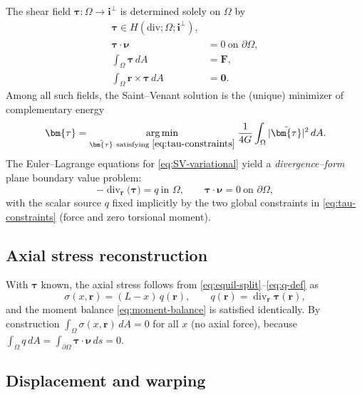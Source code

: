 The shear field $\bm{\tau}:\Omega\to\mathbf{i}^\perp$ is determined solely on $\Omega$ by
\begin{equation}
\begin{aligned}
\bm{\tau}\in H(\mathrm{div};\Omega;\mathbf{i}^\perp),\\ 
\bm{\tau}\cdot\bm{\nu}&=0\ \text{on }\partial\Omega,\\
\int_\Omega \bm{\tau}\,dA&=\bm{F},\\
\int_\Omega \bm{r}\times\bm{\tau}\,dA&=\mathbf{0}.
\end{aligned}
\label{eq:tau-constraints}
\end{equation}
Among all such fields, the Saint–Venant solution is the (unique) minimizer of complementary energy
\begin{equation}
\bm{\tau}=\underset{\tilde{\bm{\tau}}\ \text{satisfying }\eqref{eq:tau-constraints}}{\arg\min}\;
\frac{1}{4G}\int_\Omega |\tilde{\bm{\tau}}|^2\,dA.
\label{eq:SV-variational}
\end{equation}
The Euler–Lagrange equations for \eqref{eq:SV-variational} yield a \emph{divergence–form} plane boundary value problem:
\begin{equation}
-\operatorname{div}_{\bm{r}}\big(\bm{\tau}\big)=q\ \text{in }\Omega,\qquad 
\bm{\tau}\cdot\bm{\nu}=0\ \text{on }\partial\Omega,
\label{eq:tau-strong}
\end{equation}
with the scalar source $q$ fixed implicitly by the two global constraints in \eqref{eq:tau-constraints} (force and zero torsional moment). 

\subsection*{Axial stress reconstruction}

With $\bm{\tau}$ known, the axial stress follows from \eqref{eq:equil-split}–\eqref{eq:q-def} as
\begin{equation}
\sigma(x,\bm{r})=(L-x)\,q(\bm{r}),\qquad 
q(\bm{r})=\operatorname{div}_{\bm{r}}\bm{\tau}(\bm{r}),
\label{eq:sigma-from-tau}
\end{equation}
and the moment balance \eqref{eq:moment-balance} is satisfied identically. By construction $\int_\Omega \sigma(x,\bm{r})\,dA=0$ for all $x$ (no axial force), because $\int_\Omega q\,dA=\int_{\partial\Omega}\bm{\tau}\cdot\bm{\nu}\,ds=0$.

\subsection*{Displacement and warping}

